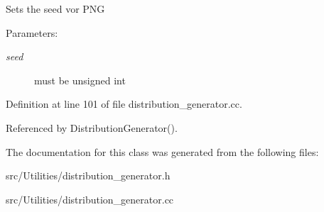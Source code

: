 Sets the seed vor PNG \begin{Desc}
\item[Parameters:]
\begin{description}
\item[{\em seed}]must be unsigned int \end{description}
\end{Desc}


Definition at line 101 of file distribution\_\-generator.cc.

Referenced by DistributionGenerator().

The documentation for this class was generated from the following files:\begin{CompactItemize}
\item 
src/Utilities/distribution\_\-generator.h\item 
src/Utilities/distribution\_\-generator.cc\end{CompactItemize}
